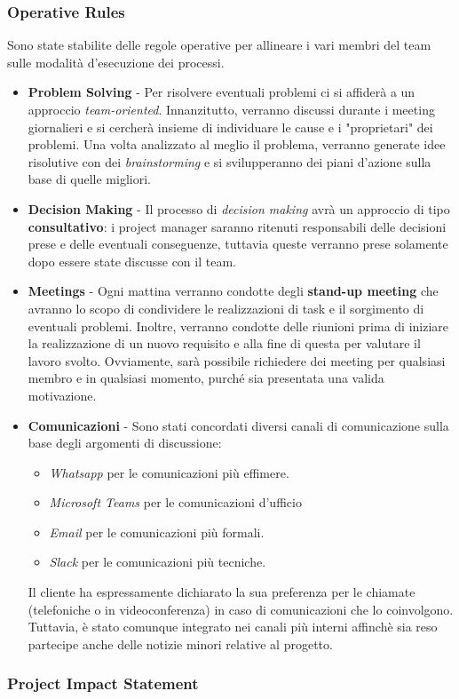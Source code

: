 \subsubsection{Operative Rules}
Sono state stabilite delle regole operative per allineare i vari membri del team sulle modalità d'esecuzione dei processi.
\begin{itemize}
    \item \textbf{Problem Solving} - Per risolvere eventuali problemi ci si affiderà a un approccio \textit{team-oriented}. Innanzitutto, verranno discussi durante i meeting giornalieri e si cercherà insieme di individuare le cause e i "proprietari" dei problemi. Una volta analizzato al meglio il problema, verranno generate idee risolutive con dei \textit{brainstorming} e si svilupperanno dei piani d'azione sulla base di quelle migliori.
    \item \textbf{Decision Making} - Il processo di \textit{decision making} avrà un approccio di tipo \textbf{consultativo}: i project manager saranno ritenuti responsabili delle decisioni prese e delle eventuali conseguenze, tuttavia queste verranno prese solamente dopo essere state discusse con il team.
    \item \textbf{Meetings} - Ogni mattina verranno condotte degli \textbf{stand-up meeting} che avranno lo scopo di condividere le realizzazioni di task e il sorgimento di eventuali problemi. Inoltre, verranno condotte delle riunioni prima di iniziare la realizzazione di un nuovo requisito e alla fine di questa per valutare il lavoro svolto. Ovviamente, sarà possibile richiedere dei meeting per qualsiasi membro e in qualsiasi momento, purché sia presentata una valida motivazione.
    \item \textbf{Comunicazioni} - Sono stati concordati diversi canali di comunicazione sulla base degli argomenti di discussione:
    \begin{itemize}
        \item \textit{Whatsapp} per le comunicazioni più effimere.
        \item \textit{Microsoft Teams} per le comunicazioni d'ufficio
        \item \textit{Email} per le comunicazioni più formali.
        \item \textit{Slack} per le comunicazioni più tecniche.
    \end{itemize}
    Il cliente ha espressamente dichiarato la sua preferenza per le chiamate (telefoniche o in videoconferenza) in caso di comunicazioni che lo coinvolgono. Tuttavia, è stato comunque integrato nei canali più interni affinchè sia reso partecipe anche delle notizie minori relative al progetto.
\end{itemize}

\subsubsection{Project Impact Statement}
